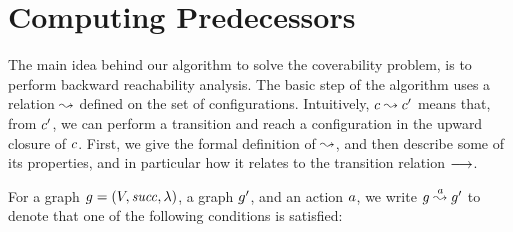 %
\section{Computing Predecessors}
\label{section:pre}
%
The main idea behind our algorithm to solve the coverability problem,
is to perform backward reachability analysis.
%
The basic step of the algorithm uses a relation $\stackrel{}{\leadsto}$ 
defined on the set of configurations.
%
Intuitively, $c\stackrel{}{\leadsto}c'$ means that, from $c'$,
we can perform a transition and reach a configuration in the upward closure of
$c$.
%
First, we give the formal definition of $\stackrel{}{\leadsto}$,
and then describe some of its properties, and in particular how it relates
to the transition relation $\stackrel{}{\longrightarrow}$.


For a graph $g=\left(V,{\it succ},\lambda\right)$, a graph
$g'$, and an action $a$, we write
$g\stackrel{a}{\leadsto}g'$ to denote that one of the following
conditions is satisfied:
%
%
